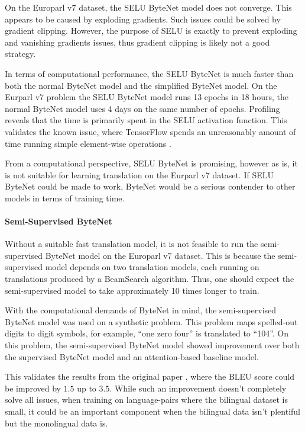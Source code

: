 On the Europarl v7 dataset, the SELU ByteNet model does not converge. This appears to be caused by exploding gradients. Such issues could be solved by gradient clipping. However, the purpose of SELU is exactly to prevent exploding and vanishing gradients issues, thus gradient clipping is likely not a good strategy.

In terms of computational performance, the SELU ByteNet is much faster than both the normal ByteNet model and the simplified ByteNet model. On the Eurparl v7 problem the SELU ByteNet model runs 13 epochs in 18 hours, the normal ByteNet model uses 4 days on the same number of epochs. Profiling reveals that the time is primarily spent in the SELU activation function. This validates the known issue, where TensorFlow spends an unreasonably amount of time running simple element-wise operations \cite{google-xla}.

From a computational perspective, SELU ByteNet is promising, however as is, it is not suitable for learning translation on the Eurparl v7 dataset. If SELU ByteNet could be made to work, ByteNet would be a serious contender to other models in terms of training time.

\paragraph{Semi-Supervised ByteNet} Without a suitable fast translation model, it is not feasible to run the semi-supervised ByteNet model on the Europarl v7 dataset. This is because the semi-supervised model depends on two translation models, each running on translations produced by a BeamSearch algorithm. Thus, one should expect the semi-supervised model to take approximately 10 times longer to train. 

With the computational demands of ByteNet in mind, the semi-supervised ByteNet model was used on a synthetic problem. This problem maps spelled-out digits to digit symbols, for example, ``one zero four'' is translated to ``104''. On this problem, the semi-supervised ByteNet model showed improvement over both the supervised ByteNet model and an attention-based baseline model.

This validates the results from the original paper \cite{semi-supervised}, where the BLEU score could be improved by $1.5$ up to $3.5$. While such an improvement doesn't completely solve all issues, when training on language-pairs where the bilingual dataset is small, it could be an important component when the bilingual data isn't plentiful but the monolingual data is.

